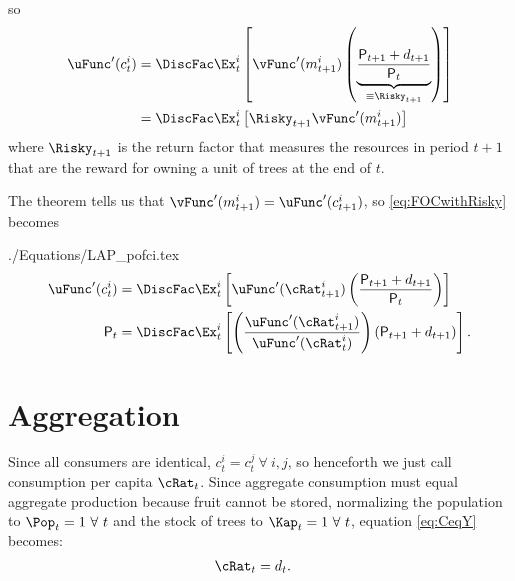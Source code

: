 \documentclass{\handout}
\begin{document}
so\hypertarget{FOCwithRisky}{}
\begin{equation}\begin{gathered}\begin{aligned}
 \uFunc^{\prime}(c_{t}^{i}) & =  \DiscFac \Ex_{t}^{i}\left[\vFunc^{\prime}({m}_{t+1}^{i})\left(\underbrace{\frac{{\Price}_{t+1}+\dvdnd_{t+1}}{\Price_{t}}}_{\equiv \Risky_{t+1}}\right)\right] \label{eq:FOCwithRisky}
\\  & =  \DiscFac \Ex_{t}^{i}\left[\Risky_{t+1} \vFunc^{\prime}({m}_{t+1}^{i})\right] 
\end{aligned}\end{gathered}\end{equation}
where $\Risky_{t+1}$ is the return factor that measures the resources in period $t+1$ that are the reward for 
owning a unit of trees at the end of $t$.

\hypertarget{pofci}{}
The  theorem tells us that  $\vFunc^{\prime}({m}_{t+1}^{i})=\uFunc^{\prime}(c_{t+1}^{i})$, so \eqref{eq:FOCwithRisky} becomes 
\begin{verbatimwrite}{./Equations/LAP_pofci.tex}
\begin{equation}\begin{gathered}\begin{aligned}
\uFunc^{\prime}(c_{t}^{i}) & =  \DiscFac \Ex_{t}^{i}\left[\uFunc^{\prime}(\cRat_{t+1}^{i})\left(\frac{{\Price}_{t+1}+\dvdnd_{t+1}}{\Price_{t}}\right)\right]  
\\ \Price_{t} & =  \DiscFac \Ex_{t}^{i}
\left[
  \left(
    \frac{\uFunc^{\prime}(\cRat_{t+1}^{i})}{\uFunc^{\prime}(\cRat_{t}^{i})}
  \right)
  \left({\Price}_{t+1}+\dvdnd_{t+1}\right) \label{eq:pofci}
\right] .
\end{aligned}\end{gathered}\end{equation}
\end{verbatimwrite}

\hypertarget{aggregation}{}
\section{Aggregation}

Since all consumers are identical, $c_{t}^{i} = c_{t}^{j}~\forall~i,j$, so henceforth we just call consumption per capita $\cRat_{t}$.  Since aggregate consumption must equal aggregate production because fruit cannot be stored, normalizing the population to $\Pop_{t}=1 ~\forall ~ t$ and the stock of trees to $\Kap_{t}=1 ~\forall~t$, equation \eqref{eq:CeqY} becomes:
\begin{equation}\begin{gathered}\begin{aligned}
\cRat_{t} & =  \dvdnd_{t}.
\end{aligned}\end{gathered}\end{equation}
\end{document}

